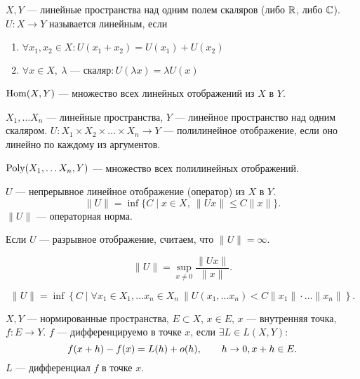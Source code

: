 \documentclass[10pt,dvipsnames]{report}
\begin{document}
\begin{defn}
    $ X, Y$ --- линейные пространства над одним полем скаляров (либо $ \mathbb{R}$, либо $ \mathbb{C}$).
    $ U: X \to  Y$ называется {\sf линейным}, если
    \begin{enumerate}[noitemsep]
	\item $ \forall  x_1, x_2 \in X \colon U(x_1+x_2) = U(x_1) + U(x_2)$
	\item $ \forall x \in X, ~ \lambda \text{ --- скаляр} \colon U(\lambda x) = \lambda U(x)$
    \end{enumerate}
	\begin{name}
		$ \operatorname{Hom}(X, Y)$ --- множество всех линейных отображений из $ X$ в $ Y$.
	\end{name}
\end{defn}
\begin{defn}
    $ X_1, \ldots X_n$ --- линейные пространства, $ Y$ --- линейное пространство над одним скаляром.
    $ U: X_1 \times  X_2 \times  \ldots \times X_n \to  Y$  --- {\sf полилинейное отображение}, если оно линейно по каждому из аргументов.
	\begin{name}
		$ \operatorname{Poly}(X_1, \ldots X_n, Y)$ --- множество всех полилинейных отображений.
	\end{name}
\end{defn}

\begin{defn}
    $ U$ --- непрерывное  линейное отображение (оператор) из $ X$ в $ Y$.
    \[
	\| U \|  = \inf \{C \mid x \in X, ~ \| Ux \| \le C \| x \| \}
    .\]
    $ \| U \|  $ --- {\sf операторная норма}.
	\begin{note}
		Если $ U$ --- разрывное отображение, считаем, что $ \| U \|  = \infty$.
	\end{note}
	\begin{note}
		\[
		\| U \|  = \sup_{x \ne 0} \frac{\| Ux \|}{\| x \| }
		.\]
	\end{note}
\end{defn}
\begin{defn}
    \[
	\| U \|  = \inf \left\{ C \mid \forall  x_1 \in X_1, \ldots x_{n} \in X_n ~ \|  U(x_1, \ldots x_{n}) < C \| x_1 \| \cdot \ldots \| x_{n} \|    \right\} 
    .\] 
\end{defn}


\begin{defn}
    $ X, Y$ --- нормированные пространства, $ E \subset X$, $ x \in E$, $ x$ --- внутренняя точка, $ f: E \to Y$.
    $ f$ --- {\sf дифференцируемо в точке  $ x$}, если $ \exists L \in L(X, Y) \colon $  
    \[
	f(x+h) - f(x) =L(h) + o(h), \qquad h \to 0, x + h \in  E
    .\] 
    $ L$ --- {\sf дифференциал } $ f$ в точке $ x$.  
\end{defn}
\end{document}
